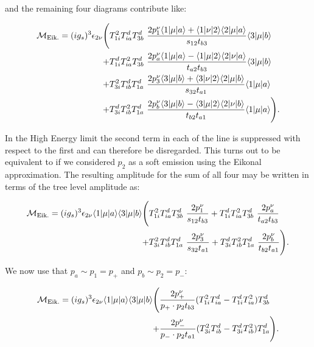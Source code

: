 		and the remaining four diagrams contribute like:

		\begin{align}
		\begin{split}
		    \mathcal{M}_{\text{Eik.}} = (ig_s)^3 \epsilon_{2\nu} \Bigg(
		     &T^2_{1i}T^d_{ia}T^d_{3b}\ \frac{2p_1^\nu\langle 1 | \mu | a \rangle + \langle 1 | \nu | 2 \rangle\langle 2 | \mu | a \rangle} {s_{12}t_{b3}} \langle 3 | \mu | b \rangle \\
		    +&T^d_{1i}T^2_{ia}T^d_{3b}\ \frac{2p_a^\nu\langle 1 | \mu | a \rangle - \langle 1 | \mu | 2 \rangle\langle 2 | \nu | a \rangle} {t_{a2}t_{b3}} \langle 3 | \mu | b \rangle \\
		    +&T^2_{3i}T^d_{ib}T^d_{1a}\ \frac{2p_3^\nu\langle 3 | \mu | b \rangle + \langle 3 | \nu | 2 \rangle\langle 2 | \mu | b \rangle} {s_{32}t_{a1}} \langle 1 | \mu | a \rangle\\
		    +&T^d_{3i}T^2_{ib}T^d_{1a}\ \frac{2p_b^\nu\langle 3 | \mu | b \rangle - \langle 3 | \mu | 2 \rangle\langle 2 | \nu | b \rangle} {t_{b2}t_{a1}} \langle 1 | \mu | a \rangle\Bigg).
			\label{eq:fulltree}
		\end{split}
		\end{align}

		In the High Energy limit the second term in each of the line is suppressed with respect to the
		first and can therefore be disregarded.  This turns out to be equivalent to if we considered
		$p_2$ as a soft emission using the Eikonal approximation.  The resulting amplitude for the sum
		of all four may be written in terms of the tree level amplitude as:

		\begin{align}
		\begin{split}
		    \mathcal{M}_{\text{Eik.}} = (ig_s)^3 \epsilon_{2\nu} \bk{1}{\mu}{a} \bk{3}{\mu}{b} \Bigg(
		     &T^2_{1i}T^d_{ia}T^d_{3b}\ \frac{2p_1^\nu}{s_{12}t_{b3}}
		    + T^d_{1i}T^2_{ia}T^d_{3b}\ \frac{2p_a^\nu}{t_{a2}t_{b3}} \\
		    +&T^2_{3i}T^d_{ib}T^d_{1a}\ \frac{2p_3^\nu}{s_{32}t_{a1}}
		    + T^d_{3i}T^2_{ib}T^d_{1a}\ \frac{2p_b^\nu}{t_{b2}t_{a1}}\Bigg).
			\label{eq:fulltree2}
		\end{split}
		\end{align}

		We now use that $p_a\sim p_1=p_+$ and $p_b\sim p_2=p_-$:

		\begin{align}
		\begin{split}
			\mathcal{M}_{\text{Eik.}} = (ig_s)^3 \epsilon_{2\nu} \langle 1 | \mu | a \rangle \langle 3 | \mu | b \rangle \Bigg(&
			\frac{2p_+^\nu}{p_+\cdot p_2 t_{b3}}(T^2_{1i}T^d_{ia} - T^d_{1i}T^2_{ia})T^d_{3b}\\
			+ &\frac{2p_-^\nu}{p_-\cdot p_2 t_{a1}}(T^2_{3i}T^d_{ib} - T^d_{3i}T^2_{ib})T^d_{1a}\Bigg).\\
		\end{split}
		\end{align}

